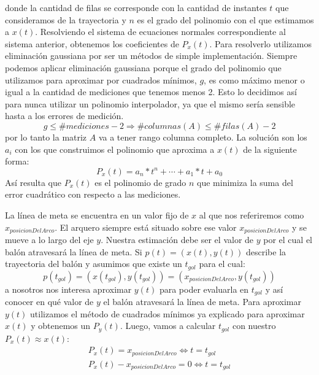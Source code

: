 donde la cantidad de filas se corresponde con la cantidad de instantes $t$ que consideramos de la trayectoria y $n$ es el grado del 
polinomio con el que estimamos a $x(t)$. Resolviendo el sistema de ecuaciones normales correspondiente al sistema anterior, obtenemos los coeficientes de $P_x(t)$. Para resolverlo utilizamos eliminación gaussiana por ser un métodos de simple
implementación. Siempre podemos aplicar eliminación gaussiana porque el grado del polinomio que utilizamos para aproximar por cuadrados mínimos, $g$,  es como máximo menor o igual a la cantidad de mediciones que tenemos menos 2. Esto lo decidimos así para nunca utilizar un polinomio interpolador, ya que el mismo sería sensible hasta a los errores de medición.
\begin{displaymath}
	g \leq \#mediciones - 2 \Longrightarrow \#columnas(A) \leq \#filas(A) - 2
\end{displaymath}
por lo tanto la matriz $A$ va a tener rango columna completo.
 La solución son los $a_i$ con los que construimos el polinomio que aproxima a $x(t)$ de la siguiente forma:
\begin{displaymath}
	P_x(t)=a_n*t^n + \cdots + a_1*t + a_0 
\end{displaymath}
Así resulta que $P_x(t)$ es el polinomio de grado $n$ que minimiza la suma del error cuadrático con respecto a las mediciones. 
\par
La línea de meta se encuentra en un valor fijo de $x$ al que nos referiremos como $x_{posicionDelArco}$. El arquero siempre está 
situado sobre ese valor $x_{posicionDelArco}$ y se mueve a lo largo del eje $y$. Nuestra estimación debe ser el valor de $y$ por el
cual el balón atravesará la línea de meta. Si $p(t) = (x(t), y(t))$ describe la trayectoria del balón y asumimos que existe un $t_{gol}$ para el 
cual:
\begin{displaymath}
  p(t_{gol}) = (x(t_{gol}), y(t_{gol})) = (x_{posicionDelArco}, y(t_{gol}))
\end{displaymath}
a nosotros nos interesa aproximar $y(t)$ para poder evaluarla en $t_{gol}$ y así conocer en qué valor de $y$ el balón atravesará la línea
de meta. Para aproximar $y(t)$ utilizamos el método de cuadrados mínimos ya explicado para aproximar $x(t)$ y obtenemos un $P_y(t)$. Luego,
vamos a calcular $t_{gol}$ con nuestro $P_x(t) \approx x(t)$:
\begin{align}
    P_x(t) = x_{posicionDelArco}  \Longleftrightarrow t = t_{gol}\\
    P_x(t) - x_{posicionDelArco} = 0 \Longleftrightarrow t = t_{gol}
\end{align}
